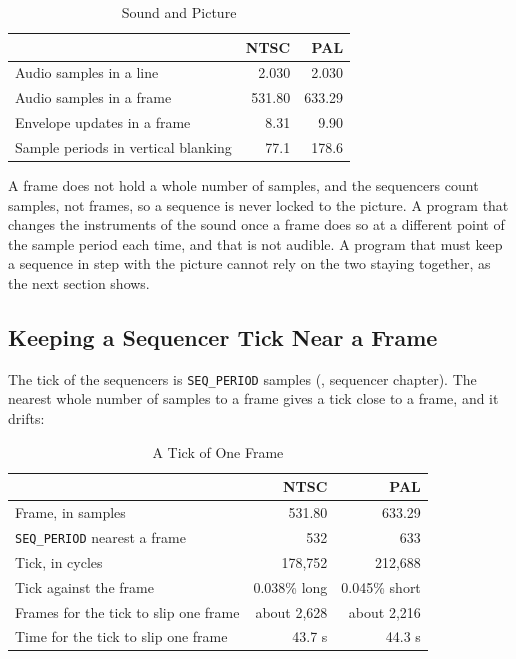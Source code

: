 \begin{table}[H]
	\centering
	\begin{tabular}{lrr}
		\toprule
		                                    & \textbf{NTSC} & \textbf{PAL} \\
		\midrule
		Audio samples in a line             & 2.030         & 2.030        \\
		Audio samples in a frame            & 531.80        & 633.29       \\
		Envelope updates in a frame         & 8.31          & 9.90         \\
		Sample periods in vertical blanking & 77.1          & 178.6        \\
		\bottomrule
	\end{tabular}
	\caption{Sound and Picture}
	\label{tab:sound-picture}
\end{table}

A frame does not hold a whole number of samples, and the sequencers count samples, not frames, so a sequence is never
locked to the picture. A program that changes the instruments of the sound once a frame does so at a different point of
the sample period each time, and that is not audible. A program that must keep a sequence in step with the picture
cannot rely on the two staying together, as the next section shows.

\subsection{Keeping a Sequencer Tick Near a Frame}

The tick of the sequencers is \texttt{SEQ\_PERIOD} samples (\audiomanual{}, sequencer chapter). The nearest whole
number of samples to a frame gives a tick close to a frame, and it drifts:

\begin{table}[H]
	\centering
	\begin{tabular}{lrr}
		\toprule
		                                      & \textbf{NTSC} & \textbf{PAL}  \\
		\midrule
		Frame, in samples                     & 531.80        & 633.29        \\
		\texttt{SEQ\_PERIOD} nearest a frame  & 532           & 633           \\
		Tick, in cycles                       & 178,752       & 212,688       \\
		Tick against the frame                & 0.038\% long  & 0.045\% short \\
		Frames for the tick to slip one frame & about 2,628   & about 2,216   \\
		Time for the tick to slip one frame   & 43.7 s        & 44.3 s        \\
		\bottomrule
	\end{tabular}
	\caption{A Tick of One Frame}
	\label{tab:tick-frame}
\end{table}

